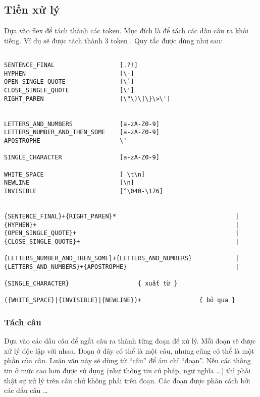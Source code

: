 \documentclass[a4paper,oneside]{book} %
\begin{document}
\subsection{Tiền xử lý}
\label{sub:preprocess}

Dựa vào flex để tách thành các token. Mục đích là để tách các dấu câu
ra khỏi tiếng. Ví dụ  sẽ được tách thành 3 token
  . Quy tắc được dùng như sau:

\begin{verbatim}

SENTENCE_FINAL                  [.?!]
HYPHEN                          [\-]
OPEN_SINGLE_QUOTE               [\`]
CLOSE_SINGLE_QUOTE              [\']
RIGHT_PAREN                     [\"\)\]\}\>\']


LETTERS_AND_NUMBERS             [a-zA-Z0-9]
LETTERS_NUMBER_AND_THEN_SOME    [a-zA-Z0-9]
APOSTROPHE                      \'

SINGLE_CHARACTER                [a-zA-Z0-9]

WHITE_SPACE                     [ \t\n]
NEWLINE                         [\n]
INVISIBLE                       [^\040-\176]


{SENTENCE_FINAL}+{RIGHT_PAREN}*                                 |
{HYPHEN}+                                                       |
{OPEN_SINGLE_QUOTE}+                                            |
{CLOSE_SINGLE_QUOTE}+                                           |

{LETTERS_NUMBER_AND_THEN_SOME}+{LETTERS_AND_NUMBERS}            |
{LETTERS_AND_NUMBERS}+{APOSTROPHE}                              |

{SINGLE_CHARACTER}                   { xuất từ }

({WHITE_SPACE}|{INVISIBLE}|{NEWLINE})+                { bỏ qua }

\end{verbatim}


\subsubsection{Tách câu}

Dựa vào các dấu câu để ngắt câu ra thành từng đoạn để xử lý. Mỗi
đoạn sẽ được xử lý độc lập với nhau. Đoạn ở đây có thể là một câu,
nhưng cũng có thể là một 
phần của câu. Luận văn này sẽ dùng từ ``câu'' để ám chỉ ``đoạn''. Nếu
các thông tin ở mức cao hơn được sử dụng (như thông tin cú pháp, ngữ
nghĩa \ldots) thì phải thật sự xử lý trên câu chứ không phải trên 
đoạn. Các đoạn được phân cách bởi các dấu câu  \fbox{,}
\fbox{;} \fbox{(} \fbox{)} \ldots 
\end{document}
